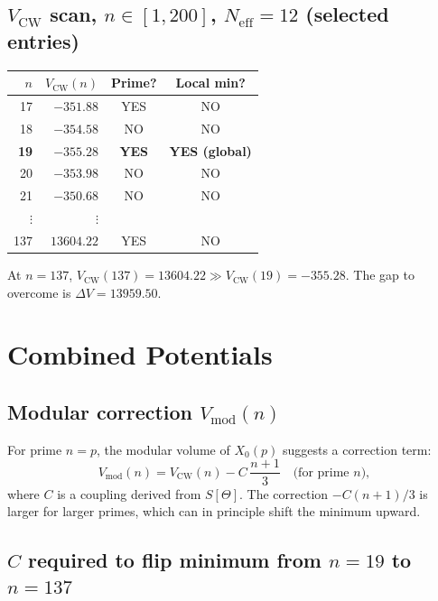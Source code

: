 \documentclass[12pt,a4paper]{article}
\theoremstyle{definition}
\theoremstyle{remark}
\newcommand{\Neff}{N_{\mathrm{eff}}}
\newcommand{\VCW}{V_{\mathrm{CW}}}
\begin{document}
\subsection{$\VCW$ scan, $n \in [1,200]$, $\Neff=12$ (selected entries)}

\begin{center}
\begin{tabular}{rrcc}
  \toprule
  $n$ & $\VCW(n)$ & Prime? & Local min? \\
  \midrule
  17 & $-351.88$ & YES & NO \\
  18 & $-354.58$ & NO  & NO \\
  \textbf{19} & $\mathbf{-355.28}$ & \textbf{YES} & \textbf{YES (global)} \\
  20 & $-353.98$ & NO  & NO \\
  21 & $-350.68$ & NO  & NO \\
  $\vdots$ & $\vdots$ & & \\
  137 & $13604.22$ & YES & NO \\
  \bottomrule
\end{tabular}
\end{center}

At $n=137$, $\VCW(137) = 13604.22 \gg \VCW(19) = -355.28$.
The gap to overcome is $\Delta V = 13959.50$.

\section{Combined Potentials}
\label{sec:vcw:combined}

\subsection{Modular correction $V_{\mathrm{mod}}(n)$}

For prime $n = p$, the modular volume of $X_0(p)$ suggests a correction term:
\begin{equation}
  V_{\mathrm{mod}}(n) = \VCW(n) - C\,\frac{n+1}{3} \quad \text{(for prime } n \text{)},
  \label{eq:Vmod}
\end{equation}
where $C$ is a coupling derived from $S[\Theta]$.  The correction $-C(n+1)/3$
is larger for larger primes, which can in principle shift the minimum upward.

\subsection{$C$ required to flip minimum from $n=19$ to $n=137$}
\end{document}
